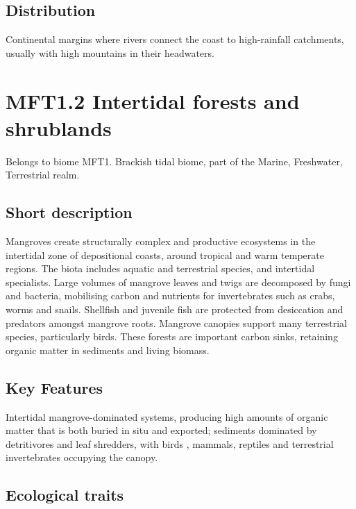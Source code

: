 \documentclass[
  letterpaper,
  DIV=11,
  numbers=noendperiod]{scrartcl}
\begin{document}
\subsection{Distribution}\label{distribution-49}

Continental margins where rivers connect the coast to high-rainfall
catchments, usually with high mountains in their headwaters.

\section{MFT1.2 Intertidal forests and
shrublands}\label{mft1.2-intertidal-forests-and-shrublands}

Belongs to biome MFT1. Brackish tidal biome, part of the Marine,
Freshwater, Terrestrial realm.

\subsection{Short description}\label{short-description-50}

Mangroves create structurally complex and productive ecosystems in the
intertidal zone of depositional coasts, around tropical and warm
temperate regions. The biota includes aquatic and terrestrial species,
and intertidal specialists. Large volumes of mangrove leaves and twigs
are decomposed by fungi and bacteria, mobilising carbon and nutrients
for invertebrates such as crabs, worms and snails. Shellfish and
juvenile fish are protected from desiccation and predators amongst
mangrove roots. Mangrove canopies support many terrestrial species,
particularly birds. These forests are important carbon sinks, retaining
organic matter in sediments and living biomass.

\subsection{Key Features}\label{key-features-50}

Intertidal mangrove-dominated systems, producing high amounts of organic
matter that is both buried in situ and exported; sediments dominated by
detritivores and leaf shredders, with birds , mammals, reptiles and
terrestrial invertebrates occupying the canopy.

\subsection{Ecological traits}\label{ecological-traits-50}
\end{document}

